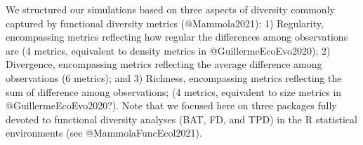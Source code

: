 \documentclass[12pt,letterpaper]{article}
\begin{document}
We structured our simulations based on three aspects of diversity commonly captured by functional diversity metrics (@Mammola2021):
1) Regularity, encompassing metrics reflecting how regular the differences among observations are (4 metrics, equivalent to density metrics in @GuillermeEcoEvo2020);
2) Divergence, encompassing metrics reflecting the average difference among observations (6 metrics); and
3) Richness, encompassing metrics reflecting the sum of difference among observations; (4 metrics, equivalent to size metrics in @GuillermeEcoEvo2020?). Note that we focused here on three packages fully devoted to functional diversity analyses (BAT, FD, and TPD) in the R statistical environments (see @MammolaFuncEcol2021).

\begin{table}
\center
\scriptsize
\begin{tabular}{p{0.1\linewidth}|p{0.15\linewidth}|p{0.15\linewidth}|p{0.2\linewidth}|p{0.15\linewidth}|p{0.1\linewidth}}


\end{tabular}
\end{table}
\end{document}
